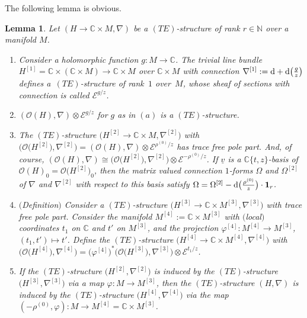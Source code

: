 \documentclass[10pt,a4paper]{amsart}
\numberwithin{equation}{section}
\numberwithin{figure}{section}
\newcommand{\N}{{\mathbb N}}
\newcommand{\C}{{\mathbb C}}
\newcommand{\EE}{{\mathcal E}}
\newcommand{\OO}{{\mathcal O}}
\newcommand{\uuuu}{\underline}
\newcommand{\nnn}{\nabla}
\newtheorem{Lemma}[Theorem]{Lemma}
\begin{document}
The following lemma is obvious.

\begin{Lemma}\label{t3.10}
Let $(H\to\C\times M,\nnn)$ be a $(TE)$-structure
of rank $r\in\N$ over a manifold $M$.

\begin{enumerate}\itemsep=0pt
\item[$(a)$] Consider a holomorphic function $g\colon M\to\C$.
The trivial line bundle $H^{[1]}=\C\times\allowbreak(\C\times M)\to
\C\times M$ over $\C\times M$ with connection
$\nnn^{[1]}:={\rm d}+{\rm d}\big(\frac{g}{z}\big)$ defines a~$(TE)$-structure of rank~$1$ over~$M$, whose sheaf of sections
with connection is called $\EE^{g/z}$.

\item[$(b)$] $(\OO(H),\nnn)\otimes \EE^{g/z}$ for $g$ as in $(a)$
is a $(TE)$-structure.

\item[$(c)$] The $(TE)$-structure $\big(H^{[2]}\to\C\times M,\nnn^{[2]}\big)$ with
$\big(\OO\big(H^{[2]}\big),\nnn^{[2]}\big)=(\OO(H),\nnn)\otimes \EE^{\rho^{(0)}/z}$
has trace free pole part. And, of course,
$(\OO(H),\nnn)\cong \big(\OO\big(H^{[2]}\big),\nnn^{[2]}\big)\otimes\EE^{-\rho^{(0)}/z}$.
If $\uuuu{v}$ is a $\C\{t,z\}$-basis of $\OO(H)_0=\OO\big(H^{[2]}\big)_0$,
then the matrix valued connection $1$-forms $\Omega$ and
$\Omega^{[2]}$ of $\nnn$ and $\nnn^{[2]}$ with respect to this
basis satisfy
$\Omega=\Omega^{[2]}-{\rm d}\big(\frac{\rho^{(0)}}{z}\big)\cdot {\bf 1}_r$.

\item[$(d)$] $($Definition$)$ Consider a $(TE)$-structure
$\big(H^{[3]}\to \C\times M^{[3]},\nnn^{[3]}\big)$ with trace free
pole part. Consider the manifold $M^{[4]}:=\C\times M^{[3]}$
with $($local$)$ coordinates $t_1$ on $\C$ and $t'$ on $M^{[3]}$,
and the projection $\varphi^{[4]}\colon M^{[4]}\to M^{[3]}$,
$(t_1,t')\mapsto t'$.
Define the $(TE)$-structure $\big(H^{[4]}\to \C\times M^{[4]},
\nnn^{[4]}\big)$ with
$\big(\OO\big(H^{[4]}\big),\nnn^{[4]}\big)
=\big(\varphi^{[4]}\big)^*\big(\OO\big(H^{[3]}\big),\nnn^{[3]}\big)\otimes \EE^{t_1/z}$.

\item[$(e)$] If the $(TE)$-structure $\big(H^{[2]},\nnn^{[2]}\big)$ is induced
by the $(TE)$-structure $\big(H^{[3]},\nnn^{[3]}\big)$ via a map
$\varphi\colon M\to M^{[3]}$, then the $(TE)$-structure $(H,\nnn)$
is induced by the $(TE)$-structure $\big(H^{[4]},\nnn^{[4]}\big)$
via the map $(-\rho^{(0)},\varphi)\colon M\to M^{[4]}=\C\times M^{[3]}$.
\end{enumerate}
\end{Lemma}
\end{document}
